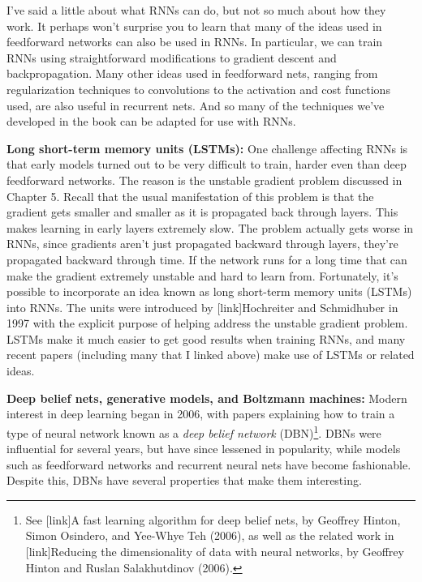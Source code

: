 \documentclass[a4paper,twoside,10pt]{book}
\begin{document}
I've said a little about what RNNs can do, but not so much about how they work. It perhaps won't surprise you to learn that many of the ideas used in feedforward networks can also be used in RNNs. In particular, we can train RNNs using straightforward modifications to gradient descent and backpropagation. Many other ideas used in feedforward nets, ranging from regularization techniques to convolutions to the activation and cost functions used, are also useful in recurrent nets. And so many of the techniques we've developed in the book can be adapted for use with RNNs.

\textbf{Long short-term memory units (LSTMs):} One challenge affecting RNNs is that early models turned out to be very difficult to train, harder even than deep feedforward networks. The reason is the unstable gradient problem discussed in Chapter 5. Recall that the usual manifestation of this problem is that the gradient gets smaller and smaller as it is propagated back through layers. This makes learning in early layers extremely slow. The problem actually gets worse in RNNs, since gradients aren't just propagated backward through layers, they're propagated backward through time. If the network runs for a long time that can make the gradient extremely unstable and hard to learn from. Fortunately, it's possible to incorporate an idea known as long short-term memory units (LSTMs) into RNNs. The units were introduced by [link]Hochreiter and Schmidhuber in 1997 with the explicit purpose of helping address the unstable gradient problem. LSTMs make it much easier to get good results when training RNNs, and many recent papers (including many that I linked above) make use of LSTMs or related ideas.

\textbf{Deep belief nets, generative models, and Boltzmann machines:} Modern interest in deep learning began in 2006, with papers explaining how to train a type of neural network known as a \textit{deep belief network} (DBN)\footnote{See [link]A fast learning algorithm for deep belief nets, by Geoffrey Hinton, Simon Osindero, and Yee-Whye Teh (2006), as well as the related work in [link]Reducing the dimensionality of data with neural networks, by Geoffrey Hinton and Ruslan Salakhutdinov (2006).}. DBNs were influential for several years, but have since lessened in popularity, while models such as feedforward networks and recurrent neural nets have become fashionable. Despite this, DBNs have several properties that make them interesting.
\end{document}
